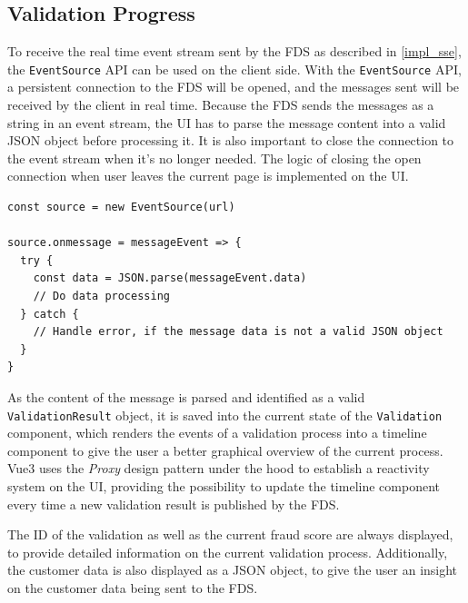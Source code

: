   \subsection{Validation Progress}
  
    To receive the real time event stream sent by the FDS as described in \autoref{impl_sse}, the \verb;EventSource; API can be used on the client side. With the \verb;EventSource; API, a persistent connection to the FDS will be opened, and the messages sent will be received by the client in real time. Because the FDS sends the messages as a string in an event stream, the UI has to parse the message content into a valid JSON object before processing it. It is also important to close the connection to the event stream when it's no longer needed. The logic of closing the open connection when user leaves the current page is implemented on the UI. 

    \begin{lstlisting}[style=es6, caption={Using the EventSource API in the browser (TypeScript)}]
const source = new EventSource(url)

source.onmessage = messageEvent => {
  try {
    const data = JSON.parse(messageEvent.data)
    // Do data processing
  } catch {
    // Handle error, if the message data is not a valid JSON object
  }
}
    \end{lstlisting}

    As the content of the message is parsed and identified as a valid \verb;ValidationResult; object, it is saved into the current state of the \verb;Validation; component, which renders the events of a validation process into a timeline component to give the user a better graphical overview of the current process. Vue3 uses the \emph{Proxy}\autocite[pp. 207-217]{gamma-1995} design pattern under the hood to establish a reactivity system on the UI, providing the possibility to update the timeline component every time a new validation result is published by the FDS. 

    The ID of the validation as well as the current fraud score are always displayed, to provide detailed information on the current validation process. Additionally, the customer data is also displayed as a JSON object, to give the user an insight on the customer data being sent to the FDS. 

